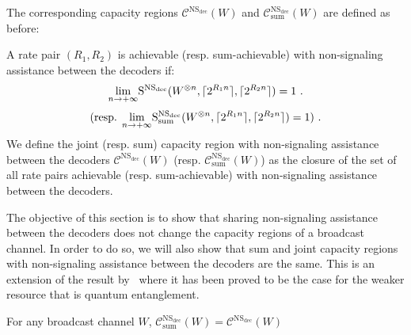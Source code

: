 The corresponding capacity regions $\mathcal{C}^{\mathrm{NS}_{\text{dec}}}(W)$ and $\mathcal{C}^{\mathrm{NS}_{\text{dec}}}_{\text{sum}}(W)$ are defined as before:

\begin{defi}
  A rate pair $(R_1,R_2)$ is achievable (resp. sum-achievable) with non-signaling assistance between the decoders if:
  \[ \underset{n \rightarrow +\infty}{\lim} \mathrm{S}^{\mathrm{NS}_{\text{dec}}}(W^{\otimes n},\lceil2^{R_1n}\rceil,\lceil2^{R_2n}\rceil) = 1 \ . \]
  \[ \text{(resp. }\underset{n \rightarrow +\infty}{\lim} \mathrm{S}^{\mathrm{NS}_{\text{dec}}}_{\text{sum}}(W^{\otimes n},\lceil2^{R_1n}\rceil,\lceil2^{R_2n}\rceil) = 1 )\ . \]
  We define the joint (resp. sum) capacity region with non-signaling assistance between the decoders $\mathcal{C}^{\mathrm{NS}_{\text{dec}}}(W)$ (resp. $\mathcal{C}^{\mathrm{NS}_{\text{dec}}}_{\text{sum}}(W)$) as the closure of the set of all rate pairs achievable (resp. sum-achievable) with non-signaling assistance between the decoders.
\end{defi}

The objective of this section is to show that sharing non-signaling assistance between the decoders does not change the capacity regions of a broadcast channel. In order to do so, we will also show that sum and joint capacity regions with non-signaling assistance between the decoders are the same. This is an extension of the result by~\cite{PDB21} where it has been proved to be the case for the weaker resource that is quantum entanglement.

\begin{prop}
  \label{prop:NSdecoderssum}
  For any broadcast channel $W$, $\mathcal{C}_{\text{sum}}^{\mathrm{NS}_{\text{dec}}}(W)= \mathcal{C}^{\mathrm{NS}_{\text{dec}}}(W)$
\end{prop}

